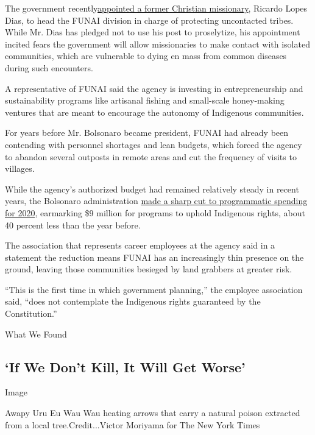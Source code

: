 The government
recently\href{https://www.nytimes3xbfgragh.onion/2020/02/05/world/americas/Brazil-indigenous-missionary.html}{appointed
a former Christian missionary}, Ricardo Lopes Dias, to head the FUNAI
division in charge of protecting uncontacted tribes. While Mr. Dias has
pledged not to use his post to proselytize, his appointment incited
fears the government will allow missionaries to make contact with
isolated communities, which are vulnerable to dying en mass from common
diseases during such encounters.

A representative of FUNAI said the agency is investing in
entrepreneurship and sustainability programs like artisanal fishing and
small-scale honey-making ventures that are meant to encourage the
autonomy of Indigenous communities.

For years before Mr. Bolsonaro became president, FUNAI had already been
contending with personnel shortages and lean budgets, which forced the
agency to abandon several outposts in remote areas and cut the frequency
of visits to villages.

While the agency's authorized budget had remained relatively steady in
recent years, the Bolsonaro administration
\href{https://indigenistasassociados.org.br/2019/10/23/proposta-de-plano-plurianual-e-de-orcamento-de-2020-enfraquece-a-funai/}{made
a sharp cut to programmatic spending for 2020}, earmarking \$9 million
for programs to uphold Indigenous rights, about 40 percent less than the
year before.

The association that represents career employees at the agency said in a
statement the reduction means FUNAI has an increasingly thin presence on
the ground, leaving those communities besieged by land grabbers at
greater risk.

``This is the first time in which government planning,'' the employee
association said, ``does not contemplate the Indigenous rights
guaranteed by the Constitution.''

What We Found

\hypertarget{if-we-dont-kill-it-will-get-worse}{%
\subsection{`If We Don't Kill, It Will Get
Worse'}\label{if-we-dont-kill-it-will-get-worse}}

Image

Awapy Uru Eu Wau Wau heating arrows that carry a natural poison
extracted from a local tree.Credit...Victor Moriyama for The New York
Times

